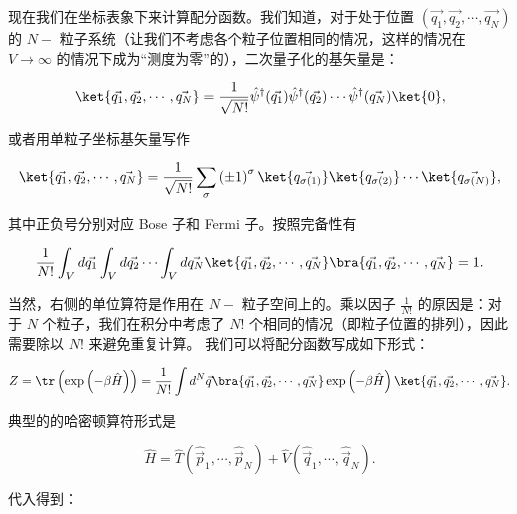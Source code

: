 现在我们在坐标表象下来计算配分函数。我们知道，对于处于位置 $\left( \vec{q_1},\vec{q_2},\cdots, \vec{q_N} \right)$ 的 $N-$ 粒子系统（让我们不考虑各个粒子位置相同的情况，这样的情况在 $V\to\infty$ 的情况下成为“测度为零”的），二次量子化的基矢量是：
\begin{linenomath}\begin{equation}
\ket{\vec{q_1},\vec{q_2},\cdots, \vec{q_N}} = \frac{1}{\sqrt{N!}} \hat{\psi}^\dagger(\vec{q_1}) \hat{\psi}^\dagger(\vec{q_2}) \cdots \hat{\psi}^\dagger(\vec{q_N}) \ket{0},
\end{equation}\end{linenomath}
或者用单粒子坐标基矢量写作
\begin{linenomath}\begin{equation}
\ket{\vec{q_1},\vec{q_2},\cdots, \vec{q_N}} = \frac{1}{\sqrt{N!}} \sum_{\sigma}\left( \pm 1 \right)^\sigma \ket{\vec{q_{\sigma(1)}}}\ket{\vec{q_{\sigma(2)}}}\cdots\ket{\vec{q_{\sigma(N)}}},
\end{equation}\end{linenomath}
其中正负号分别对应 Bose 子和 Fermi 子。按照完备性有
\begin{linenomath}\begin{equation}
    \frac{1}{N!} \int_V d\vec{q_1} \int_V d\vec{q_2} \cdots \int_V d\vec{q_N} \ket{\vec{q_1},\vec{q_2},\cdots, \vec{q_N}} \bra{\vec{q_1},\vec{q_2},\cdots, \vec{q_N}} = 1.
\end{equation}\end{linenomath}
当然，右侧的单位算符是作用在 $N-$ 粒子空间上的。乘以因子 $\frac{1}{N!}$ 的原因是：对于 $N$ 个粒子，我们在积分中考虑了 $N!$ 个相同的情况（即粒子位置的排列），因此需要除以 $N!$ 来避免重复计算。
我们可以将配分函数写成如下形式：
\begin{linenomath}\begin{equation}
    Z  = \tr\left( \exp\left( -\beta \hat{H} \right) \right) = \frac{1}{N!}\int d^N\vec{q} \bra{\vec{q_1},\vec{q_2},\cdots, \vec{q_N}} \exp\left( -\beta \hat{H} \right) \ket{\vec{q_1},\vec{q_2},\cdots, \vec{q_N}}.
\end{equation}\end{linenomath}
典型的的哈密顿算符形式是
\begin{linenomath}\begin{equation}
    \hat{H} = \hat{T}\left( \hat{\vec{p}}_1,\cdots,\hat{\vec{p}}_N \right) + \hat{V}\left( \hat{\vec{q}}_1,\cdots,\hat{\vec{q}}_N \right).
\end{equation}\end{linenomath}
代入得到：
